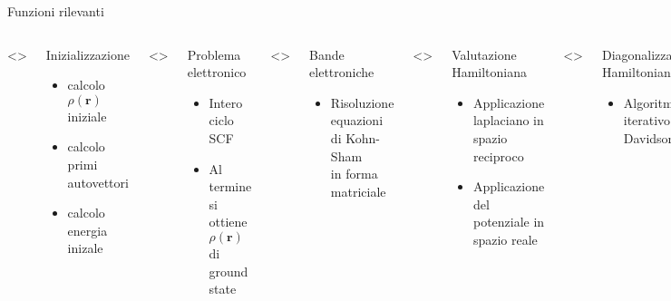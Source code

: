 \documentclass[8pt]{beamer}
\newcommand\dens{\rho(\mathbf{r})}
\newcommand\erre{\mathbf{r}}
\begin{document}
\begin{frame}{Funzioni rilevanti}
{\begin{minipage}[t][0.5\textheight][t]{\textwidth}
\begin{columns}
				\only<>{
					\begin{block}{Inizializzazione} 
						\begin{itemize}
							\item calcolo $\dens$ iniziale
							\item calcolo primi autovettori
							\item calcolo energia inizale
					\end{itemize}
					\end{block}
				}
				
				\only<\electronsPos>{
					\begin{block}{Problema elettronico} 
						\begin{itemize}
							\item Intero ciclo SCF
							\item Al termine si ottiene $\dens$ di ground state
					\end{itemize}
					\end{block}
				}
				\only<\cegtergPos>{
					\begin{block}{Bande elettroniche} 
						\begin{itemize}
							\item Risoluzione equazioni di Kohn-Sham\\in forma matriciale
					\end{itemize}
					\end{block}
				}
				\only<\hpsiPos>{
					\begin{block}{Valutazione Hamiltoniana} 
						\begin{itemize}
							\item Applicazione laplaciano in spazio reciproco
							\item Applicazione del potenziale in spazio reale
						\end{itemize}
					\end{block}
				}
				\only<\cdiaghgPos>{
					\begin{block}{Diagonalizzazione Hamiltoniana} 
						\begin{itemize}
							\item Algoritmo iterativo di Davidson
						\end{itemize}
					\end{block}
				}
				\only<\sumbandPos>{
					\begin{block}{Calcolo densit\`a elettronica} 
						\begin{itemize}
							\item calcolo occupazione orbitali
							\item $\displaystyle \dens = \sum_{i} f_{\psi_{i}} ~ \psi_{i}^{*KS}(\erre) ~ \psi_{i}^{KS}(\erre)$

\end{itemize}
\end{block}}
\end{columns}
\end{minipage}}
\end{frame}
\end{document}
